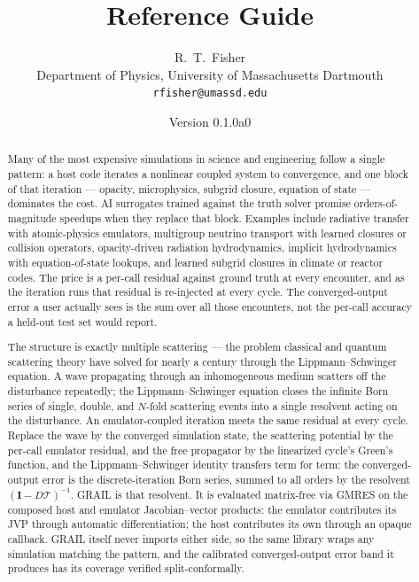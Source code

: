 \documentclass[11pt]{article}
\title{Reference Guide}
\author{R.~T.~Fisher\\
{\small Department of Physics, University of Massachusetts Dartmouth}\\
{\small \texttt{rfisher@umassd.edu}}}
\date{Version 0.1.0a0}
\begin{document}
\sloppy


\begin{abstract}
\noindent Many of the most expensive simulations in science and
engineering follow a single pattern: a host code iterates a nonlinear
coupled system to convergence, and one block of that iteration ---
opacity, microphysics, subgrid closure, equation of state --- dominates
the cost.  AI surrogates trained against the truth solver promise
orders-of-magnitude speedups when they replace that block.  Examples
include radiative transfer with atomic-physics emulators, multigroup
neutrino transport with learned closures or collision operators,
opacity-driven radiation hydrodynamics, implicit hydrodynamics with
equation-of-state lookups, and learned subgrid closures in climate or
reactor codes.  The price is a per-call residual against ground truth
at every encounter, and as the iteration runs that residual is
re-injected at every cycle.  The converged-output error a user
actually sees is the sum over all those encounters, not the per-call
accuracy a held-out test set would report.

The structure is exactly multiple scattering --- the problem
classical and quantum scattering theory have solved for nearly a
century through the Lippmann--Schwinger equation.  A wave propagating
through an inhomogeneous medium scatters off the disturbance
repeatedly; the Lippmann--Schwinger equation closes the infinite
Born series of single, double, and $N$-fold scattering events into a
single resolvent acting on the disturbance.  An emulator-coupled
iteration meets the same residual at every cycle.  Replace the wave
by the converged simulation state, the scattering potential by the
per-call emulator residual, and the free propagator by the linearized
cycle's Green's function, and the Lippmann--Schwinger identity
transfers term for term: the converged-output error is the
discrete-iteration Born series, summed to all orders by the resolvent
$(\mathbf{I} - D\mathcal{T})^{-1}$.  GRAIL is that resolvent.  It is
evaluated matrix-free via GMRES on the composed host and emulator
Jacobian--vector products: the emulator contributes its JVP through
automatic differentiation; the host contributes its own through an
opaque callback.  GRAIL itself never imports either side, so the same
library wraps any simulation matching the pattern, and the calibrated
converged-output error band it produces has its coverage verified
split-conformally.


\end{abstract}
\end{document}
